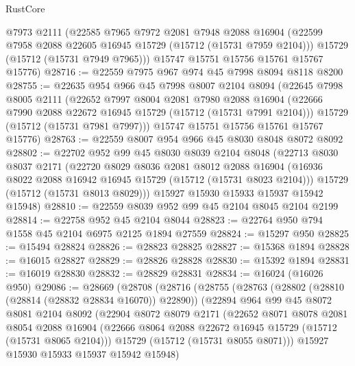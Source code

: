 \begin{lexlean}{RustCore}
\begin{coremodule}
      @7973
      @2111
      (@22585
        @7965
        @7972
        @2081
        @7948
        @2088
        @16904
        (@22599 @7958 @2088 @22605 @16945 @15729 (@15712 (@15731 @7959 @2104)))
        @15729
        (@15712 (@15731 @7949 @7965)))
      @15747
      @15751
      @15756
      @15761
      @15767
      @15776)
@28716 := @22559 @7975 @967 @974 @45 @7998 @8094 @8118 @8200
@28755 := @22635
    @954
    @966
    @45
    @7998
    @8007
    @2104
    @8094
    (@22645
      @7998
      @8005
      @2111
      (@22652
        @7997
        @8004
        @2081
        @7980
        @2088
        @16904
        (@22666 @7990 @2088 @22672 @16945 @15729 (@15712 (@15731 @7991 @2104)))
        @15729
        (@15712 (@15731 @7981 @7997)))
      @15747
      @15751
      @15756
      @15761
      @15767
      @15776)
@28763 := @22559 @8007 @954 @966 @45 @8030 @8048 @8072 @8092
@28802 := @22702
    @952
    @99
    @45
    @8030
    @8039
    @2104
    @8048
    (@22713
      @8030
      @8037
      @2171
      (@22720
        @8029
        @8036
        @2081
        @8012
        @2088
        @16904
        (@16936 @8022 @2088 @16942 @16945 @15729 (@15712 (@15731 @8023 @2104)))
        @15729
        (@15712 (@15731 @8013 @8029)))
      @15927
      @15930
      @15933
      @15937
      @15942
      @15948)
@28810 := @22559 @8039 @952 @99 @45 @2104 @8045 @2104 @2199
@28814 := @22758 @952 @45 @2104 @8044
@28823 := @22764 @950 @794 @1558 @45 @2104 @6975 @2125 @1894 @27559
@28824 := @15297 @950
@28825 := @15494 @28824
@28826 := @28823 @28825
@28827 := @15368 @1894
@28828 := @16015 @28827
@28829 := @28826 @28828
@28830 := @15392 @1894
@28831 := @16019 @28830
@28832 := @28829 @28831
@28834 := @16024 (@16026 @950)
@29086 := @28669
    (@28708
      (@28716
        (@28755
          (@28763
            (@28802 (@28810 (@28814 (@28832 @28834 @16070)) @22890))
            (@22894
              @964
              @99
              @45
              @8072
              @8081
              @2104
              @8092
              (@22904
                @8072
                @8079
                @2171
                (@22652
                  @8071
                  @8078
                  @2081
                  @8054
                  @2088
                  @16904
                  (@22666 @8064 @2088 @22672 @16945 @15729 (@15712 (@15731 @8065 @2104)))
                  @15729
                  (@15712 (@15731 @8055 @8071)))
                @15927
                @15930
                @15933
                @15937
                @15942
                @15948)

\end{coremodule}
\end{lexlean}
